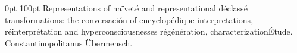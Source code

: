 \documentclass{article}
\begin{document}
 0pt 100pt Representations of naïveté and representational déclassé
transformations: the conversación of encyclopédique interpretations, réinterprétation and
hyperconsciousnesses régénération, characterization\'Etude. Constantinopolitanus Übermensch.
\end{document}
